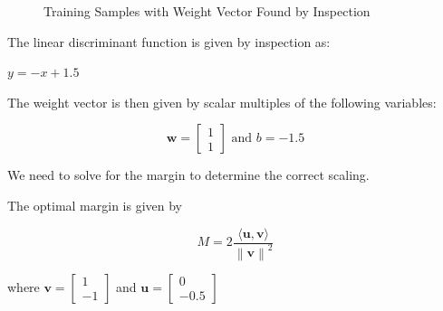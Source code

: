 \documentclass[fleqn]{article}
\newcommand{\norm}[1]{\left \lVert #1 \right \rVert}
\begin{document}
\begin{enumerate}
\begin{enumerate}
		\begin{figure}[H]
			\centerline{}
			\caption{Training Samples with Weight Vector Found by Inspection}
			\label{solution_by_inspection}
		\end{figure}
		
		The linear discriminant function is given by inspection as:
		
		$y = -x + 1.5$		
		
		The weight vector is then given by scalar multiples of the following variables:
		
		\begin{equation*}
			\mathbf{w} = \begin{bmatrix} 1 \\ 1 \end{bmatrix} \text{ and } b = -1.5
		\end{equation*}
		
		We need to solve for the margin to determine the correct scaling.
		
		The optimal margin is given by
		
		\begin{equation*}
			M = 2\frac{\langle\mathbf{u}, \mathbf{v}\rangle}{\norm{\mathbf{v}}^2}
		\end{equation*}
		
		where $\mathbf{v} = \begin{bmatrix} 1 \\ -1 \end{bmatrix}$ and $\mathbf{u} = \begin{bmatrix} 0 \\ -0.5 \end{bmatrix}$
		

\end{enumerate}
\end{enumerate}
\end{document}
